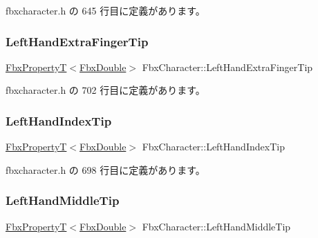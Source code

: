  fbxcharacter.\+h の 645 行目に定義があります。

\mbox{\label{class_fbx_character_a3a19b1cede7154da466412bb01220f2c}} 
\subsubsection{\texorpdfstring{Left\+Hand\+Extra\+Finger\+Tip}{LeftHandExtraFingerTip}}
{\footnotesize\ttfamily \hyperlink{class_fbx_property_t}{Fbx\+PropertyT}$<$\hyperlink{fbxtypes_8h_a171e72a1c46fc15c1a6c9c31948c1c5b}{Fbx\+Double}$>$ Fbx\+Character\+::\+Left\+Hand\+Extra\+Finger\+Tip}



 fbxcharacter.\+h の 702 行目に定義があります。

\mbox{\label{class_fbx_character_a1ae3703bd72f19cff4b80605c1480821}} 
\subsubsection{\texorpdfstring{Left\+Hand\+Index\+Tip}{LeftHandIndexTip}}
{\footnotesize\ttfamily \hyperlink{class_fbx_property_t}{Fbx\+PropertyT}$<$\hyperlink{fbxtypes_8h_a171e72a1c46fc15c1a6c9c31948c1c5b}{Fbx\+Double}$>$ Fbx\+Character\+::\+Left\+Hand\+Index\+Tip}



 fbxcharacter.\+h の 698 行目に定義があります。

\mbox{\label{class_fbx_character_ab5cf7b96b3813681933bd9e2e029f2aa}} 
\subsubsection{\texorpdfstring{Left\+Hand\+Middle\+Tip}{LeftHandMiddleTip}}
{\footnotesize\ttfamily \hyperlink{class_fbx_property_t}{Fbx\+PropertyT}$<$\hyperlink{fbxtypes_8h_a171e72a1c46fc15c1a6c9c31948c1c5b}{Fbx\+Double}$>$ Fbx\+Character\+::\+Left\+Hand\+Middle\+Tip}



